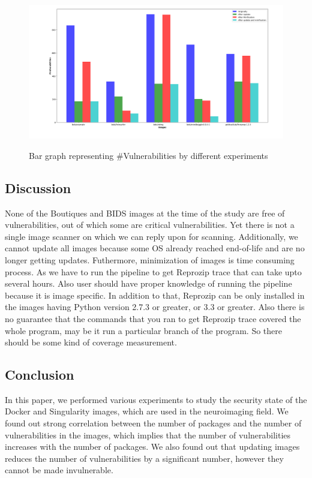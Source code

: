 \documentclass[a4paper,num-refs]{oup-contemporary}
\begin{document}
\begin{figure}
        {\includegraphics[scale=1.5,width=\textwidth]
        {Figures/bargraph.png}}
        \caption{\label{fig:bargraph} Bar graph representing \#Vulnerabilities by different experiments}
      \end{figure}


\subsection{Discussion}

None of the Boutiques and BIDS images at the time of the study are free of vulnerabilities, out of which
some are critical vulnerabilities. Yet there is not a single image scanner on which we can reply upon for
scanning. Additionally, we cannot update all images because some OS already reached end-of-life and are
no longer getting updates. Futhermore, minimization of images is time consuming process. As we have to run
the pipeline to get Reprozip trace that can take upto several hours. Also user should have proper knowledge
of running the pipeline because it is image specific. In addition to that, Reprozip can be only installed
in the images having Python version 2.7.3 or greater, or 3.3 or greater. Also there is no guarantee that
the commands that you ran to get Reprozip trace covered the whole program, may be it run a particular
branch of the program. So there should be some kind of coverage measurement.

\subsection{Conclusion}

In this paper, we performed various experiments to study the security state of the Docker
and Singularity images, which are used in the neuroimaging field. We found out strong correlation
between the number of packages and the number of vulnerabilities in the images, which implies
that the number of vulnerabilities increases with the number of packages. We also found out that
updating images reduces the number of vulnerabilities by a significant number, however they cannot
be made invulnerable.


\end{document}
